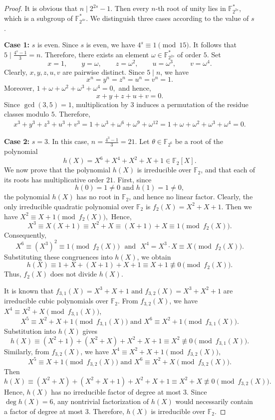 \documentclass[12pt,draftcls,journal,onecolumn]{IEEEtran}
\begin{document}
\begin{proof}
It is obvious that
$
n\mid 2^{2s}-1.
$
Then every $n$-th root of unity lies in $\mathbb F_{2^{2s}}^*$, which is a subgroup of $\mathbb F_{2^{4s}}^*$.
We distinguish three cases according to the value of $s$.


\medskip

\noindent
\textbf{Case 1:} $s$ is even.
Since $s$ is even, we have
$
4^s\equiv 1\pmod{15}.
$
It follows that
$
5\mid \frac{4^s-1}{3}=n.
$
Therefore, there exists an element $\omega\in\mathbb{F}_{2^{2s}}^*$
of order $5$. Set
\[
x=1,\qquad
y=\omega,\qquad
z=\omega^2,\qquad
u=\omega^3,\qquad
v=\omega^4.
\]
Clearly, $x,y,z,u,v$ are pairwise distinct. Since $5\mid n$, we have
\[
x^n=y^n=z^n=u^n=v^n=1.
\]
Moreover,
$
1+\omega+\omega^2+\omega^3+\omega^4=0,
$
and hence,
\[
x+y+z+u+v=0.
\]
Since $\gcd(3,5)=1$, multiplication by $3$ induces a permutation
of the residue classes modulo $5$. Therefore,
\[
\begin{aligned}
x^3+y^3+z^3+u^3+v^3
=1+\omega^3+\omega^6+\omega^9+\omega^{12}=1+\omega+\omega^2+\omega^3+\omega^4=0.
\end{aligned}
\]

\medskip

\noindent
\textbf{Case 2:}  $s=3$.
In this case,
$
n=\frac{4^3-1}{3}=21.
$
Let $\theta\in\mathbb F_{2^6}$ be a root of the polynomial
\[
h(X)=X^6+X^4+X^2+X+1\in \mathbb F_2[X].
\]
We now prove that the polynomial
$
h(X)
$
is irreducible over $\mathbb F_2$, and that each of its roots has multiplicative order $21$.
First, since
\[
h(0)=1\neq 0
\,\,\text{and}\,\,
h(1)=1\neq 0,
\]
the polynomial $
h(X)
$ has no root in $\mathbb F_2$, and hence no linear factor.
Clearly, the only irreducible quadratic polynomial over $\mathbb F_2$ is
$
f_2(X)=X^2+X+1.
$
Then we have
$
X^2\equiv X+1 \pmod {f_2(X)},
$
Hence,
\[
X^3\equiv X(X+1)\equiv X^2+X\equiv (X+1)+X\equiv 1 \pmod {f_2(X)}.
\]
Consequently,
\[
X^6\equiv (X^3)^2\equiv 1 \pmod {f_2(X)}
\,\,\,\,\text{and}\,\,\,\,
X^4= X^3\cdot X\equiv X \pmod {f_2(X)}.
\]
Substituting these congruences into $h(X)$, we obtain
\[
h(X)\equiv 1+X+(X+1)+X+1\equiv X+1\not\equiv 0\pmod{f_2(X)}.
\]
Thus, \(f_2(X)\) does not divide \(h(X)\).

It is known that
$
f_{3,1}(X)=X^3+X+1
\,\,\text{and}\,\,
f_{3,2}(X)=X^3+X^2+1
$
are irreducible cubic polynomials over \(\mathbb F_2\).
From \(f_{3,2}(X)\), we have $X^4\equiv X^2+X \pmod{f_{3,1}(X)}$,
\[
X^5\equiv X^2+X+1 \pmod{f_{3,1}(X)}\,\, \text{and}\,\,X^6\equiv X^2+1 \pmod{f_{3,1}(X)}.\]
Substitution into \(h(X)\) gives
\[
h(X)\equiv (X^2+1)+(X^2+X)+X^2+X+1\equiv X^2\not\equiv 0\pmod{f_{3,1}(X)}.
\]
Similarly, from \(f_{3,2}(X)\), we have $X^4\equiv X^2+X+1\pmod{f_{3,2}(X)},$
\[
X^5\equiv X+1\pmod{f_{3,2}(X)}\,\,\text{and}\,\,
X^6\equiv X^2+X\pmod{f_{3,2}(X)}.
\]
Then
\[
h(X)\equiv (X^2+X)+(X^2+X+1)+X^2+X+1\equiv X^2+X\not\equiv 0\pmod{f_{3,2}(X)}.
\]
Hence, \(h(X)\) has no irreducible factor of degree at most \(3\). Since \(\deg h(X)=6\), any nontrivial factorization of \(h(X)\) would necessarily contain a factor of degree at most \(3\). Therefore, \(h(X)\) is irreducible over \(\mathbb F_2\).


\end{proof}
\end{document}
